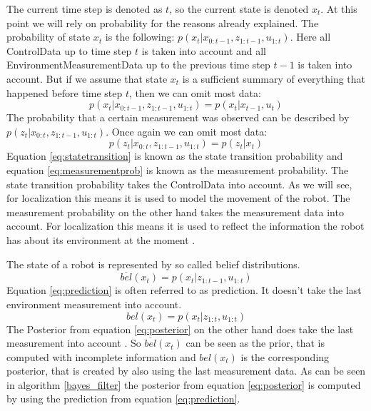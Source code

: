 The current time step is denoted as $t$, so the current state is denoted $x_t$. At this point we will rely on probability for the reasons already explained. The probability of state $x_t$ is the following: $p(x_t|x_{0:t-1},z_{1:t-1}, u_{1:t})$. Here all \gls{ControlData} up to time step $t$ is taken into account and all \gls{EnvironmentMeasurementData} up to the previous time step $t-1$ is taken into account. But if we assume that state $x_t$ is a sufficient summary of everything that happened before time step $t$, then we can omit most data: 
\begin{equation} \label{eq:statetransition}
p(x_t|x_{0:t-1},z_{1:t-1}, u_{1:t}) = p(x_t|x_{t-1}, u_t)
\end{equation}
The probability that a certain measurement was observed can be described by $p(z_t|x_{0:t},z_{1:t-1}, u_{1:t})$. Once again we can omit most data:
\begin{equation} \label{eq:measurementprob}
p(z_t|x_{0:t},z_{1:t-1}, u_{1:t}) = p(z_t|x_t)
\end{equation}
Equation \ref{eq:statetransition} is known as the state transition probability and equation \ref{eq:measurementprob} is known as the measurement probability. The state transition probability takes the \gls{ControlData} into account. As we will see, for localization this means it is used to model the movement of the robot. The measurement probability on the other hand takes the measurement data into account. For localization this means it is used to reflect the information the robot has about its environment at the moment \citep[p.\ 24-25]{Thrun:2005:PR:1121596}.

The state of a robot is represented by so called belief distributions. 
\begin{equation} \label{eq:prediction}
\overline{bel}(x_t) = p(x_t|z_{1:t-1}, u_{1:t})
\end{equation}
Equation \ref{eq:prediction} is often referred to as prediction. It doesn't take the last environment measurement into account. 
\begin{equation} \label{eq:posterior}
bel(x_t) = p(x_t|z_{1:t}, u_{1:t})
\end{equation}
The \gls{Posterior} from equation \ref{eq:posterior} on the other hand does take the last measurement into account \citep[p.\ 25-26]{Thrun:2005:PR:1121596}. So $\overline{bel}(x_t)$ can be seen as the prior, that is computed with incomplete information and ${bel}(x_t)$ is the corresponding posterior, that is created by also using the last measurement data. As can be seen in algorithm \ref{bayes_filter} the posterior from equation \ref{eq:posterior} is computed by using the prediction from equation \ref{eq:prediction}.

